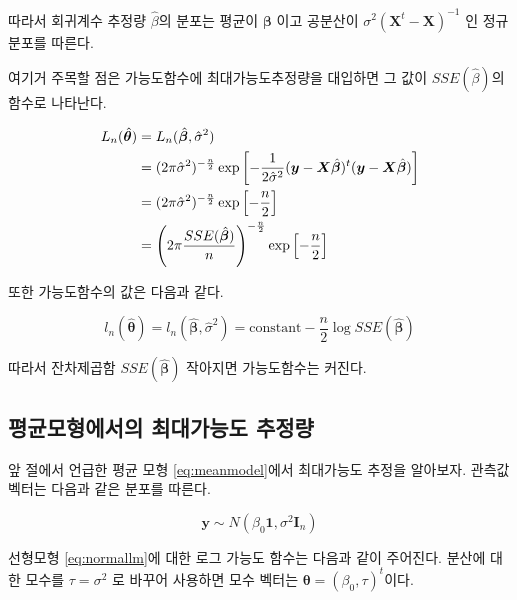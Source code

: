 \documentclass[
]{book}
\theoremstyle{definition}
\theoremstyle{definition}
\theoremstyle{definition}
\theoremstyle{remark}
\begin{document}
따라서 회귀계수 추정량 \(\hat { \beta}\)의 분포는 평균이 \(\bm \beta\) 이고
공분산이 \(\sigma^2( {\bm X}^t - \bm X)^{-1}\) 인 정규분포를 따른다.

여기거 주목할 점은 가능도함수에 최대가능도추정량을 대입하면 그 값이
\(SSE(\hat { \beta})\)의 함수로 나타난다.

\begin{align}
 L_n(\hat { \bm \theta} ) & = L_n(\hat { \bm \beta} ,\hat \sigma^2 ) \notag \\
 &=  (2\pi\hat \sigma^2)^{-\frac{n}{2}} \exp \left [-\frac{1}{2 \hat \sigma^2}( \bm y- \bm X \hat { \bm \beta})^t( \bm y- \bm X \hat { \bm \beta} ) \right ] \notag  \\
& = (2\pi\hat \sigma^2)^{-\frac{n}{2}} \exp \left [-\frac{n}{2} \right ]  \notag  \\
& = \left (2\pi \frac{SSE(\hat { \bm \beta})}{n} \right )^{-\frac{n}{2}} \exp \left [-\frac{n}{2} \right ] 
\label{eq:likefull}
\end{align}

또한 가능도함수의 값은 다음과 같다.

\begin{equation*}
l_n(\hat { \bm \theta} ) = l_n(\hat { \bm \beta} ,\hat \sigma^2 ) 
= \text{constant}  - \frac{n}{2} \log SSE(\hat { \bm \beta})
\end{equation*}

따라서 잔차제곱함 \(SSE(\hat { \bm \beta})\) 작아지면
가능도함수는 커진다.

\hypertarget{uxd3c9uxade0uxbaa8uxd615uxc5d0uxc11cuxc758-uxcd5cuxb300uxac00uxb2a5uxb3c4-uxcd94uxc815uxb7c9}{%
\subsection{평균모형에서의 최대가능도 추정량}\label{uxd3c9uxade0uxbaa8uxd615uxc5d0uxc11cuxc758-uxcd5cuxb300uxac00uxb2a5uxb3c4-uxcd94uxc815uxb7c9}}

앞 절에서 언급한 평균 모형 \eqref{eq:meanmodel}에서 최대가능도 추정을 알아보자. 관측값 벡터는 다음과 같은 분포를 따른다.

\begin{equation}
\bm y \sim N( \beta_0 \bm 1 , \sigma^2 \bm I_n) 
\label{eq:meanlm}
\end{equation}

선형모형 \eqref{eq:normallm}에 대한 로그 가능도 함수는 다음과 같이 주어진다. 분산에 대한 모수를 \(\tau=\sigma^2\) 로 바꾸어 사용하면 모수 벡터는 \(\bm \theta = (\beta_0, \tau)^t\)이다.
\end{document}
